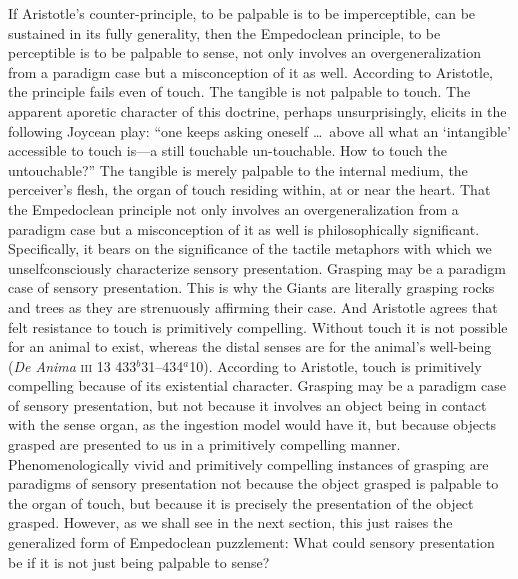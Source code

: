 If Aristotle's counter-principle, to be palpable is to be imperceptible, can be sustained in its fully generality, then the Empedoclean principle, to be perceptible is to be palpable to sense, not only involves an overgeneralization from a paradigm case but a misconception of it as well. According to Aristotle, the principle fails even of touch. The tangible is not palpable to touch. The apparent aporetic character of this doctrine, perhaps unsurprisingly, elicits in \citet[6]{Derrida:2005aa} the following Joycean play: ``one keeps asking oneself \ldots\ above all what an `intangible' accessible to touch is---a still touchable un-touchable. How to touch the untouchable?'' The tangible is merely palpable to the internal medium, the perceiver's flesh, the organ of touch residing within, at or near the heart. That the Empedoclean principle not only involves an overgeneralization from a paradigm case but a misconception of it as well is philosophically significant. Specifically, it bears on the significance of the tactile metaphors with which we unselfconsciously characterize sensory presentation. Grasping may be a paradigm case of sensory presentation. This is why the Giants are literally grasping rocks and trees as they are strenuously affirming their case. And Aristotle agrees that felt resistance to touch is primitively compelling. Without touch it is not possible for an animal to exist, whereas the distal senses are for the animal's well-being (\emph{De Anima} \textsc{iii} 13 433\( ^{b} \)31--434\( ^{a} \)10). According to Aristotle, touch is primitively compelling because of its existential character. Grasping may be a paradigm case of sensory presentation, but not because it involves an object being in contact with the sense organ, as the ingestion model would have it, but because objects grasped are presented to us in a primitively compelling manner. Phenomenologically vivid and primitively compelling instances of grasping are paradigms of sensory presentation not because the object grasped is palpable to the organ of touch, but because it is precisely the presentation of the object grasped. However, as we shall see in the next section, this just raises the generalized form of Empedoclean puzzlement: What could sensory presentation be if it is not just being palpable to sense?

